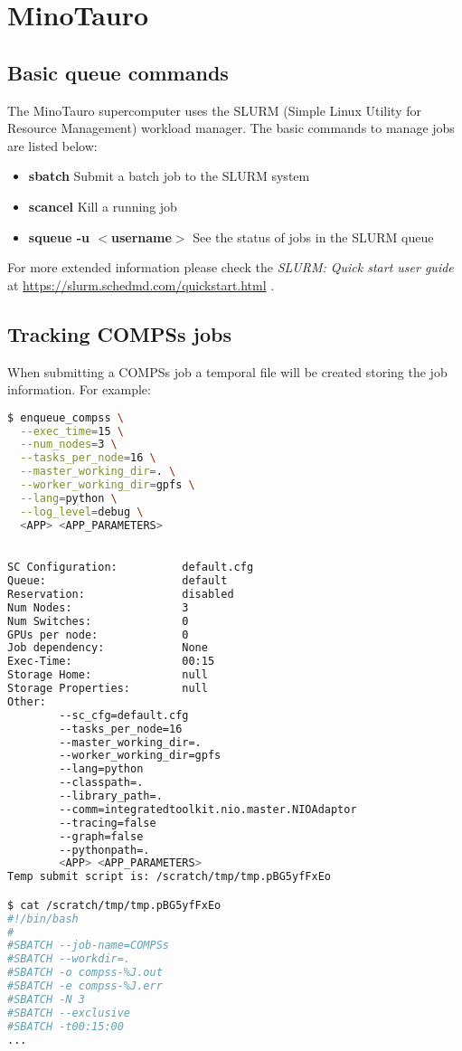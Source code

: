 \section{MinoTauro}
\label{sec:minotauro}

\subsection{Basic queue commands}

The MinoTauro supercomputer uses the SLURM (Simple Linux Utility for Resource Management) workload manager. The basic commands 
to manage jobs are listed below:

\begin{itemize}
 \item \textbf{sbatch} Submit a batch job to the SLURM system
 \item \textbf{scancel} Kill a running job 
 \item \textbf{squeue -u $<$username$>$} See the status of jobs in the SLURM queue
\end{itemize}

For more extended information please check the \textit{SLURM: Quick start user guide} at 
\url{https://slurm.schedmd.com/quickstart.html} .


\subsection{Tracking COMPSs jobs}

When submitting a COMPSs job a temporal file will be created storing the job information. For example:

\begin{lstlisting}[language=bash]
$ enqueue_compss \
  --exec_time=15 \
  --num_nodes=3 \
  --tasks_per_node=16 \
  --master_working_dir=. \
  --worker_working_dir=gpfs \
  --lang=python \
  --log_level=debug \
  <APP> <APP_PARAMETERS>

  
SC Configuration:          default.cfg
Queue:                     default
Reservation:               disabled
Num Nodes:                 3
Num Switches:              0
GPUs per node:             0
Job dependency:            None
Exec-Time:                 00:15
Storage Home:              null
Storage Properties:        null
Other:                     
        --sc_cfg=default.cfg
        --tasks_per_node=16
        --master_working_dir=.
        --worker_working_dir=gpfs
        --lang=python
        --classpath=.
        --library_path=.
        --comm=integratedtoolkit.nio.master.NIOAdaptor
        --tracing=false
        --graph=false
        --pythonpath=.
        <APP> <APP_PARAMETERS>
Temp submit script is: /scratch/tmp/tmp.pBG5yfFxEo

$ cat /scratch/tmp/tmp.pBG5yfFxEo
#!/bin/bash
#
#SBATCH --job-name=COMPSs
#SBATCH --workdir=. 
#SBATCH -o compss-%J.out
#SBATCH -e compss-%J.err
#SBATCH -N 3
#SBATCH --exclusive
#SBATCH -t00:15:00 
...
\end{lstlisting}

